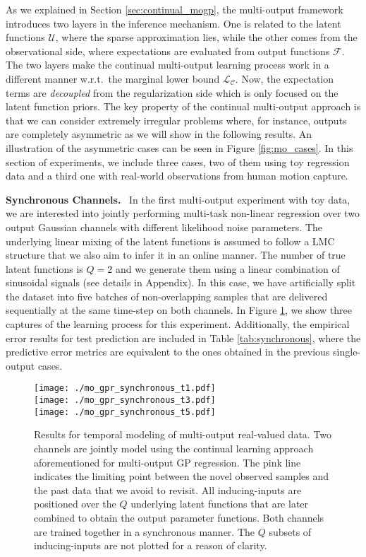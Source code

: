 \documentclass[]{article}
\newcommand{\Fcal}{\mathcal{F}}
\newcommand{\Ucal}{\mathcal{U}}
\newcommand{\Lcal}{\mathcal{L}}
\begin{document}
As we explained in Section \ref{sec:continual_mogp}, the multi-output framework introduces two layers in the inference mechanism. One is related to the latent functions $\Ucal$, where the sparse approximation lies, while the other comes from the observational side, where expectations are evaluated from output functions $\Fcal$. The two layers make the continual multi-output learning process work in a different manner w.r.t.\ the marginal lower bound $\Lcal_{\mathcal{C}}$. Now, the expectation terms are \textit{decoupled} from the regularization side which is only focused on the latent function priors. The key property of the continual multi-output approach is that we can consider extremely irregular problems where, for instance, outputs are completely asymmetric as we will show in the following results. An illustration of the asymmetric cases can be seen in Figure \ref{fig:mo_cases}. In this section of experiments, we include three cases, two of them using toy regression data and a third one with real-world observations from human motion capture.

\textbf{Synchronous Channels.}~ In the first multi-output experiment with toy data, we are interested into jointly performing multi-task non-linear regression over two output Gaussian channels with different likelihood noise parameters. The underlying linear mixing of the latent functions is assumed to follow a LMC structure that we also aim to infer it in an online manner. The number of true latent functions is $Q=2$ and we generate them using a linear combination of sinusoidal signals (see details in Appendix). In this case, we have artificially split the dataset into five batches of non-overlapping samples that are delivered sequentially at the same time-step on both channels. In Figure \ref{fig:synchronous}, we show three captures of the learning process for this experiment. Additionally, the empirical error results for test prediction are included in Table \ref{tab:synchronous}, where the predictive error metrics are equivalent to the ones obtained in the previous single-output cases. 

\begin{figure}[] \centering
	\texttt{[image: ./mo\_gpr\_synchronous\_t1.pdf]}\\
	\vspace{0.1cm}
	\texttt{[image: ./mo\_gpr\_synchronous\_t3.pdf]}\\
	\vspace{0.1cm}
	\texttt{[image: ./mo\_gpr\_synchronous\_t5.pdf]}
	\caption{Results for temporal modeling of multi-output real-valued data. Two channels are jointly model using the continual learning approach aforementioned for multi-output GP regression. The pink line indicates the limiting point between the novel observed samples and the past data that we avoid to revisit. All inducing-inputs are positioned over the $Q$ underlying latent functions that are later combined to obtain the output parameter functions. Both channels are trained together in a synchronous manner. The $Q$ subsets of inducing-inputs are not plotted for a reason of clarity.}
	\label{fig:synchronous}
\end{figure}
\end{document}
